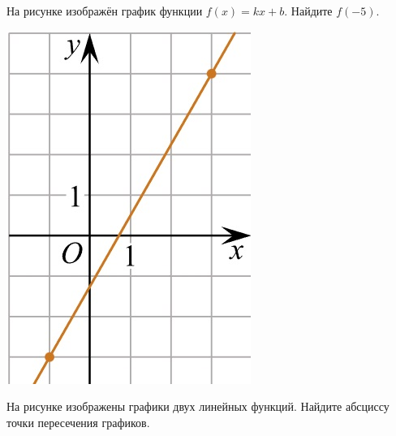 \begin{homework}[number=2]
	\begin{listofex}
		\item 
		\begin{minipage}[t]{0.67\textwidth}
			На рисунке изображён график функции \(f(x)=kx+b\). Найдите \(f(-5)\).
		\end{minipage}
		\begin{minipage}[c]{0.25\textwidth}
			\includegraphics[width=\textwidth]{pics/G101M4H2-1.jpg}
		\end{minipage}
		\item 
		\begin{minipage}[t]{0.67\textwidth}
			На рисунке изображены графики двух линейных функций. Найдите абсциссу точки пересечения графиков.
		\end{minipage}
		\begin{minipage}[c]{0.25\textwidth}

\end{minipage}
\end{listofex}
\end{homework}
